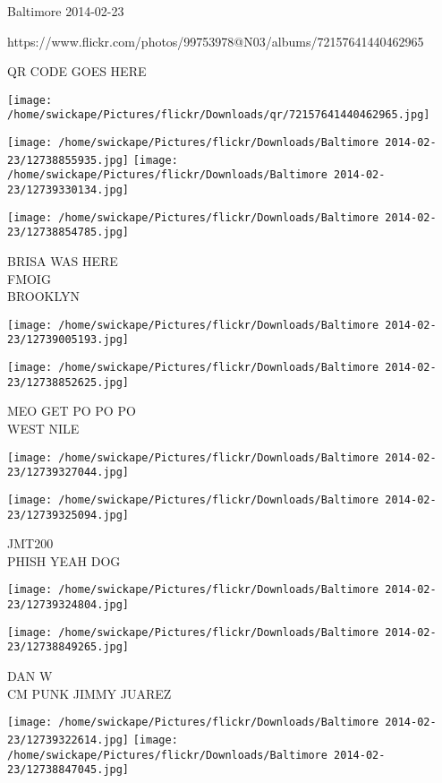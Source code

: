 \documentclass[10pt,letterpaper]{article}
\begin{document}
Baltimore 2014-02-23

https://www.flickr.com/photos/99753978@N03/albums/72157641440462965

QR CODE GOES HERE

\texttt{[image: /home/swickape/Pictures/flickr/Downloads/qr/72157641440462965.jpg]}
\pagebreak

\texttt{[image: /home/swickape/Pictures/flickr/Downloads/Baltimore 2014-02-23/12738855935.jpg]}
\texttt{[image: /home/swickape/Pictures/flickr/Downloads/Baltimore 2014-02-23/12739330134.jpg]}

\texttt{[image: /home/swickape/Pictures/flickr/Downloads/Baltimore 2014-02-23/12738854785.jpg]}

BRISA WAS HERE\\
FMOIG\\
BROOKLYN\\
\pagebreak

\texttt{[image: /home/swickape/Pictures/flickr/Downloads/Baltimore 2014-02-23/12739005193.jpg]}

\vspace{0.25in}
\texttt{[image: /home/swickape/Pictures/flickr/Downloads/Baltimore 2014-02-23/12738852625.jpg]}

MEO GET PO PO PO\\
WEST NILE\\
\pagebreak

\texttt{[image: /home/swickape/Pictures/flickr/Downloads/Baltimore 2014-02-23/12739327044.jpg]}

\vspace{0.25in}
\texttt{[image: /home/swickape/Pictures/flickr/Downloads/Baltimore 2014-02-23/12739325094.jpg]}

JMT200\\
PHISH YEAH DOG\\
\pagebreak

\texttt{[image: /home/swickape/Pictures/flickr/Downloads/Baltimore 2014-02-23/12739324804.jpg]}

\vspace{0.25in}
\texttt{[image: /home/swickape/Pictures/flickr/Downloads/Baltimore 2014-02-23/12738849265.jpg]}

DAN W\\
CM PUNK JIMMY JUAREZ\\
\pagebreak

\texttt{[image: /home/swickape/Pictures/flickr/Downloads/Baltimore 2014-02-23/12739322614.jpg]}
\texttt{[image: /home/swickape/Pictures/flickr/Downloads/Baltimore 2014-02-23/12738847045.jpg]}
\end{document}
